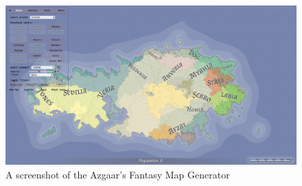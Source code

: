 \begin{figure}[htb]
\centering
\includegraphics[width=\textwidth]{section01/assets/screenshot_FMG.png}
\caption[A screenshot of the Azgaar's Fantasy Map Generator]{\label{Sample Map 1}A screenshot of the Azgaar's Fantasy Map Generator}
\end{figure}


